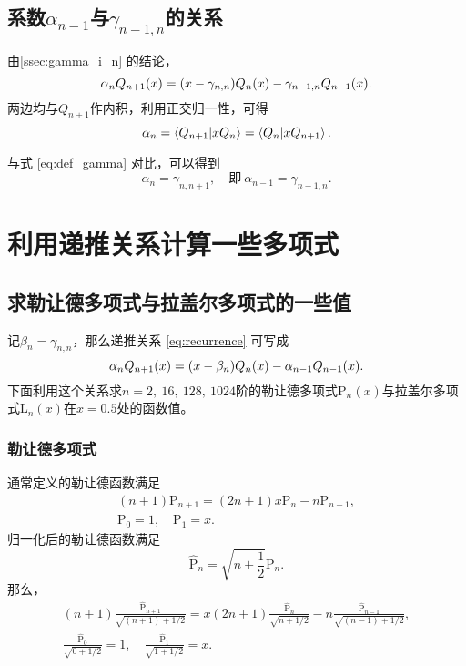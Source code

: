 \documentclass[a4paper,unicode]{report}
\begin{document}
\subsection{系数\texorpdfstring{$\alpha_{n-1}$}{α\_\{n-1\}}与\texorpdfstring{$\gamma_{n-1,n}$}{γ\_\{n-1,n\}}的关系}
由\autoref{ssec:gamma_i_n} 的结论，
\begin{equation} \label{eq:recurrence}
    \alpha_n Q_{n+1}(x) = \qty(x - \gamma_{n,n}) Q_n(x) - \gamma_{n-1,n} Q_{n-1}(x).
\end{equation}
两边均与$Q_{n+1}$作内积，利用正交归一性，可得
\begin{equation}
    \alpha_n = \braket{Q_{n+1}}{xQ_n} = \braket{Q_n}{xQ_{n+1}}.
\end{equation}

与式 \eqref{eq:def_gamma} 对比，可以得到
\begin{equation}
    \alpha_n = \gamma_{n, n+1},\quad\text{即}\ \alpha_{n-1} = \gamma_{n-1, n}.
\end{equation}

\section{利用递推关系计算一些多项式}
\subsection{求勒让德多项式与拉盖尔多项式的一些值}
记$\beta_n = \gamma_{n, n}$，那么递推关系 \eqref{eq:recurrence} 可写成
\begin{equation} \label{eq:beau_recurrence}
    \alpha_n Q_{n+1}(x) = \qty(x - \beta_n) Q_n(x) - \alpha_{n-1} Q_{n-1}(x).
\end{equation}
下面利用这个关系求$n=2,\ 16,\ 128,\ 1024$阶的勒让德多项式$\mathrm{P}_n(x)$与拉盖尔多项式$\mathrm{L}_n(x)$在$x=0.5$处的函数值。

\subsubsection{勒让德多项式}
通常定义的勒让德函数满足
\begin{gather}
    (n+1)\mathrm{P}_{n+1}=(2n+1)x\mathrm{P}_{n}-n\mathrm{P}_{n-1},\\
    \mathrm{P}_0 = 1,\quad \mathrm{P}_1 = x.
\end{gather}
归一化后的勒让德函数满足
\begin{equation}
    \hat{\mathrm{P}}_n = \sqrt{n + \frac{1}{2}} \mathrm{P}_n.
\end{equation}
那么，
\begin{gather}
    (n+1)\frac{\hat{\mathrm{P}}_{n+1}}{\sqrt{(n+1)+1/2}}=x(2n+1)\frac{\hat{\mathrm{P}}_{n}}{\sqrt{n+1/2}}-n\frac{\hat{\mathrm{P}}_{n-1}}{\sqrt{(n-1)+1/2}},\\
    \frac{\hat{\mathrm{P}}_{0}}{\sqrt{0+1/2}} = 1,\quad \frac{\hat{\mathrm{P}}_{1}}{\sqrt{1+1/2}} = x.
\end{gather}
\end{document}
